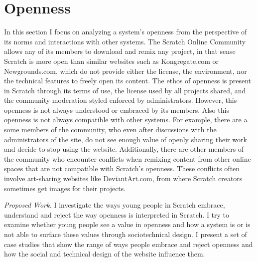 
\section{Openness}
In this section I focus on analyzing a system's openness from the perspective of its norms and interactions with other systems.
The Scratch Online Community allows any of its members to download and remix any project, in that sense Scratch is more open than similar websites such as Kongregate.com or Newgrounds.com, which do not provide either the license, the environment, nor the technical features to freely open its content. 
The ethos of openness is present in Scratch through its terms of use, the license used by all projects shared, and the community moderation styled enforced by administrators.
However, this openness is not always understood or embraced by its members.
Also this openness is not always compatible with other systems.
For example, there are a some members of the community, who even after discussions with the administrators of the site, do not see enough value of openly sharing their work and decide to stop using the website. 
Additionally, there are other members of the community who encounter conflicts when remixing content from other online spaces that are not compatible with Scratch's openness. 
These conflicts often involve art-sharing websites like DeviantArt.com, from where Scratch creators sometimes get images for their projects.

\emph{Proposed Work.}
I  investigate the ways young people in Scratch embrace, understand and reject the way openness is interpreted in Scratch.
I try to examine whether young people see a value in openness and how a system is or is not able to surface these values through sociotechnical design.
I present a set of case studies that show the range of ways people embrace and reject openness and how the social and technical design of the website influence them. 

